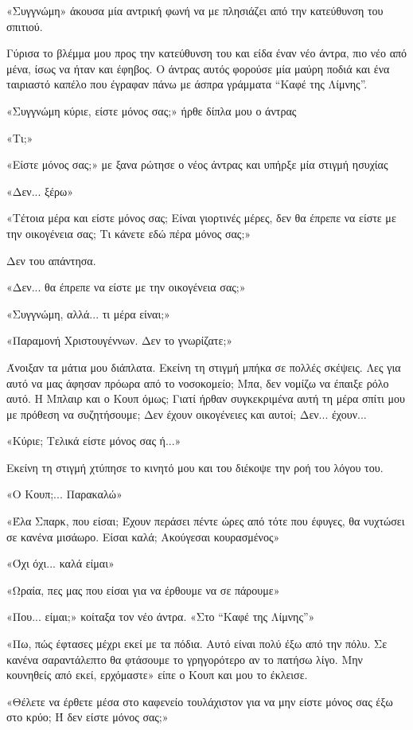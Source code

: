 \documentclass[12pt,twoside, openany]{book}
\begin{document}
«Συγγνώμη» άκουσα μία αντρική φωνή να με πλησιάζει από την κατεύθυνση του σπιτιού. 

Γύρισα το βλέμμα μου προς την κατεύθυνση του και είδα έναν νέο άντρα, πιο νέο από μένα, ίσως να ήταν και έφηβος. Ο άντρας αυτός φορούσε μία μαύρη ποδιά και ένα ταιριαστό καπέλο που έγραφαν πάνω με άσπρα γράμματα “Καφέ της Λίμνης”.

«Συγγνώμη κύριε, είστε μόνος σας;» ήρθε δίπλα μου ο άντρας

«Τι;»

«Είστε μόνος σας;» με ξανα ρώτησε ο νέος άντρας και υπήρξε μία στιγμή ησυχίας

«Δεν... ξέρω»

«Τέτοια μέρα και είστε μόνος σας; Είναι γιορτινές μέρες, δεν θα έπρεπε να είστε με την οικογένεια σας; Τι κάνετε εδώ πέρα μόνος σας;»

Δεν του απάντησα.

«Δεν... θα έπρεπε να είστε με την οικογένεια σας;»

«Συγγνώμη, αλλά... τι μέρα είναι;»

«Παραμονή Χριστουγέννων. Δεν το γνωρίζατε;»

Άνοιξαν τα μάτια μου διάπλατα. Εκείνη τη στιγμή μπήκα σε πολλές σκέψεις. Λες για αυτό να μας άφησαν πρόωρα από το νοσοκομείο; Μπα, δεν νομίζω να έπαιξε ρόλο αυτό. Η Μπλαιρ και ο Κουπ όμως; Γιατί ήρθαν συγκεκριμένα αυτή τη μέρα σπίτι μου με πρόθεση να συζητήσουμε; Δεν έχουν οικογένειες και αυτοί; Δεν... έχουν...

«Κύριε; Τελικά είστε μόνος σας ή...»

Εκείνη τη στιγμή χτύπησε το κινητό μου και του διέκοψε την ροή του λόγου του.

«Ο Κουπ;... Παρακαλώ»

«Έλα Σπαρκ, που είσαι; Έχουν περάσει πέντε ώρες από τότε που έφυγες, θα νυχτώσει σε κανένα μισάωρο. Είσαι καλά; Ακούγεσαι κουρασμένος»

«Όχι όχι... καλά είμαι»

«Ωραία, πες μας που είσαι για να έρθουμε να σε πάρουμε»

«Που... είμαι;» κοίταξα τον νέο άντρα. «Στο “Καφέ της Λίμνης”»

«Πω, πώς έφτασες μέχρι εκεί με τα πόδια. Αυτό είναι πολύ έξω από την πόλυ. Σε κανένα σαραντάλεπτο θα φτάσουμε το γρηγορότερο αν το πατήσω λίγο. Μην κουνηθείς από εκεί, ερχόμαστε» είπε ο Κουπ και μου το έκλεισε.

«Θέλετε να έρθετε μέσα στο καφενείο τουλάχιστον για να μην είστε μόνος σας έξω στο κρύο; Ή δεν είστε μόνος σας;»
\end{document}
